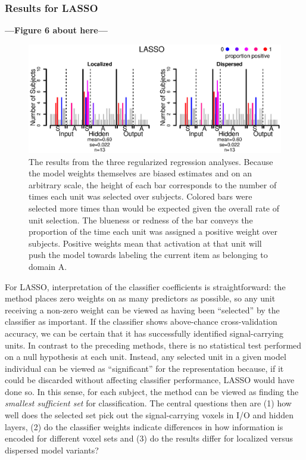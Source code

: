 \subsubsection{Results for LASSO}
\textbf{---Figure 6 about here---}
\begin{figure}
\centering
\includegraphics[width=1\textwidth]{figures/lasso_only.eps}
\caption{\label{fig.lasso} The results from the three regularized regression analyses. Because the model weights themselves are biased estimates and on an arbitrary scale, the height of each bar corresponds to the number of times each unit was selected over subjects. Colored bars were selected more times than would be expected given the overall rate of unit selection. The blueness or redness of the bar conveys the proportion of the time each unit was assigned a positive weight over subjects. Positive weights mean that activation at that unit will push the model towards labeling the current item as belonging to domain A.}
\end{figure}

For LASSO, interpretation of the classifier coefficients is straightforward: the method places zero weights on as many predictors as possible, so any unit receiving a non-zero weight can be viewed as having been ``selected'' by the classifier as important. If the classifier shows above-chance cross-validation accuracy, we can be certain that it has successfully identified signal-carrying units. In contrast to the preceding methods, there is no statistical test performed on a null hypothesis at each unit. Instead, any selected unit in a given model individual can be viewed as ``significant'' for the representation because, if it could be discarded without affecting classifier performance, LASSO would have done so. In this sense, for each subject, the method can be viewed as finding the {\em smallest sufficient set} for classification. The central questions then are (1) how well does the selected set pick out the signal-carrying voxels in I/O and hidden layers, (2) do the classifier weights indicate differences in how information is encoded for different voxel sets and (3) do the results differ for localized versus dispersed model variants?

